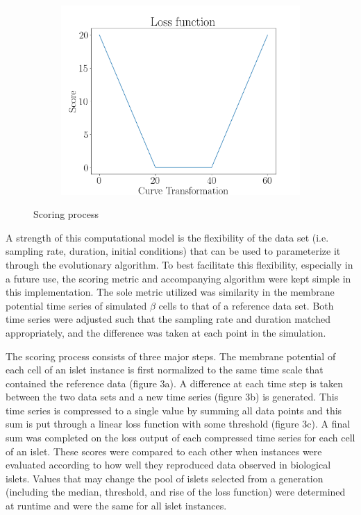 \begin{figure}[h!]
\begin{subfigure}{.33\textwidth}
		\includegraphics[scale=0.20]{Figures/loss.png}
		\caption{}
		\label{loss}
	\end{subfigure}%
	\caption{Scoring process}
\end{figure}
A strength of this computational model is the flexibility of the data set (i.e. sampling rate, duration, initial conditions) that can be used to parameterize it through the evolutionary algorithm. To best facilitate this flexibility, especially in a future use, the scoring metric and accompanying algorithm were kept simple in this implementation. The sole metric utilized was similarity in the membrane potential time series of simulated $\beta$ cells  to that of a reference data set. Both time series were adjusted such that the sampling rate and duration matched appropriately, and the difference was taken at each point in the simulation. 
\par The scoring process consists of three major steps. The membrane potential of each cell of an islet instance is first normalized to the same time scale that contained the reference data (figure 3a). A difference at each time step is taken between the two data sets and a new time series (figure 3b) is generated. This time series is compressed to a single value by summing all data points and this sum is put through a linear loss function with some threshold (figure 3c). A final sum was completed on the loss output of each compressed time series for each cell of an islet. These scores were compared to each other when instances were evaluated according to how well they reproduced data observed in biological islets. Values that may change the pool of islets selected from a generation (including the median, threshold, and rise of the loss function) were determined at runtime and were the same for all islet instances.